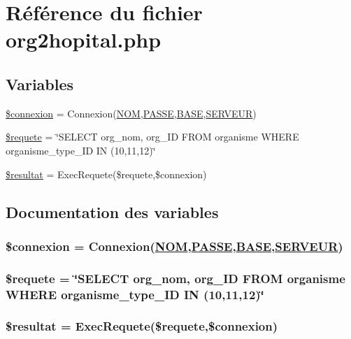 \hypertarget{org2hopital_8php}{
\section{R\'{e}f\'{e}rence du fichier org2hopital.php}
\label{org2hopital_8php}
}
\subsection*{Variables}
\begin{CompactItemize}
\item 
\hyperlink{org2hopital_8php_a0}{\$connexion} = Connexion(\hyperlink{pma__connect_8php_a0}{NOM},\hyperlink{pma__connect_8php_a1}{PASSE},\hyperlink{pma__connect_8php_a3}{BASE},\hyperlink{pma__connect_8php_a2}{SERVEUR})
\item 
\hyperlink{org2hopital_8php_a1}{\$requete} = \char`\"{}SELECT org\_\-nom, org\_\-ID FROM organisme WHERE organisme\_\-type\_\-ID IN (10,11,12)\char`\"{}
\item 
\hyperlink{org2hopital_8php_a2}{\$resultat} = Exec\-Requete(\$requete,\$connexion)
\end{CompactItemize}


\subsection{Documentation des variables}
\hypertarget{org2hopital_8php_a0}{
\subsubsection[\$connexion]{\setlength{\rightskip}{0pt plus 5cm}\$connexion = Connexion(\hyperlink{pma__connect_8php_a0}{NOM},\hyperlink{pma__connect_8php_a1}{PASSE},\hyperlink{pma__connect_8php_a3}{BASE},\hyperlink{pma__connect_8php_a2}{SERVEUR})}}
\label{org2hopital_8php_a0}


\hypertarget{org2hopital_8php_a1}{
\subsubsection[\$requete]{\setlength{\rightskip}{0pt plus 5cm}\$requete = \char`\"{}SELECT org\_\-nom, org\_\-ID FROM organisme WHERE organisme\_\-type\_\-ID IN (10,11,12)\char`\"{}}}
\label{org2hopital_8php_a1}


\hypertarget{org2hopital_8php_a2}{
\subsubsection[\$resultat]{\setlength{\rightskip}{0pt plus 5cm}\$resultat = Exec\-Requete(\$requete,\$connexion)}}
\label{org2hopital_8php_a2}



